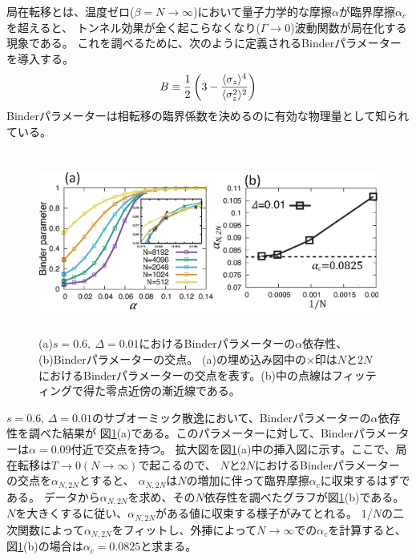 局在転移とは、温度ゼロ($\beta = N \rightarrow \infty$)において量子力学的な摩擦$\alpha$が臨界摩擦$\alpha_c$を超えると、
トンネル効果が全く起こらなくなり($\Gamma\rightarrow0$)波動関数が局在化する現象である。
これを調べるために、次のように定義されるBinderパラメーターを導入する。
\begin{eqnarray}
	B\equiv\frac{1}{2}\left(3-\frac{\langle\sigma_z\rangle^4}{\langle\sigma_z^2\rangle^2}\right)
\end{eqnarray}
Binderパラメーターは相転移の臨界係数を決めるのに有効な物理量として知られている。 
\begin{figure}[tb]
	\centering
	\includegraphics[height=6.0cm]{binder_parameter.eps}
	\caption{
	(a)$s=0.6,\ \Delta=0.01$におけるBinderパラメーターの$\alpha$依存性、(b)Binderパラメーターの交点。 (a)の埋め込み図中の×印は$N$と$2N$におけるBinderパラメーターの交点を表す。(b)中の点線はフィッティングで得た零点近傍の漸近線である。
	}
	\label{fig:binder_parameter}
\end{figure}

$s=0.6$, $\Delta=0.01$のサブオーミック散逸において、Binderパラメーターの$\alpha$依存性を調べた結果が
図\ref{fig:binder_parameter}(a)である。このパラメーターに対して、Binderパラメーターは$\alpha=0.09$付近で交点を持つ。
拡大図を図\ref{fig:binder_parameter}(a)中の挿入図に示す。ここで、局在転移は$T\rightarrow0(N\rightarrow\infty)$で起こるので、
$N$と$2N$におけるBinderパラメーターの交点を$\alpha_{N,2N}$とすると、
$\alpha_{N,2N}$は$N$の増加に伴って臨界摩擦$\alpha_c$に収束するはずである。
データから$\alpha_{N,2N}$を求め、その$N$依存性を調べたグラフが図\ref{fig:binder_parameter}(b)である。
$N$を大きくするに従い、$\alpha_{N,2N}$がある値に収束する様子がみてとれる。
$1/N$の二次関数によって$\alpha_{N,2N}$をフィットし、外挿によって$N\rightarrow\infty$での$\alpha_c$を計算すると、
図\ref{fig:binder_parameter}(b)の場合は$\alpha_c=0.0825$と求まる。

